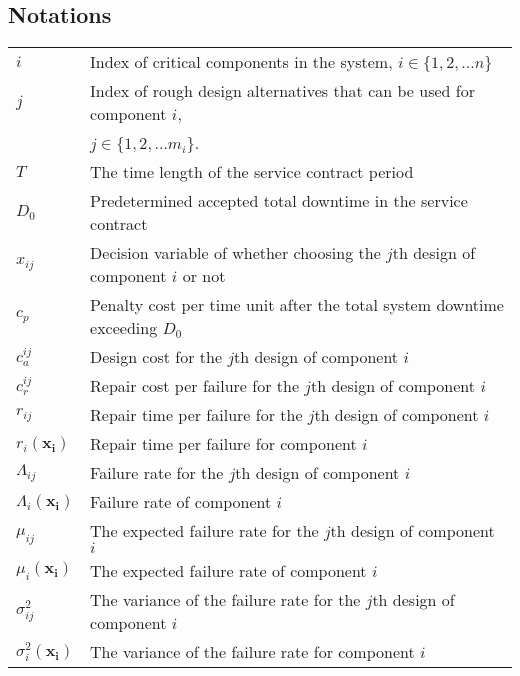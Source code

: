 \documentclass[preprint,12pt]{elsarticle}
\begin{document}
 \subsection{Notations}
   \begin{tabular}{l l}
$i$ & Index of critical components in the system, $i \in \{1,2,...n\}$\\
$j$ & Index of rough design alternatives that can be used for component $i$, \\
    & $j \in \{1,2,...m_{i}\}$.\\
$T$ & The time length of the service contract period\\
$D_0$ & Predetermined accepted total downtime in the service contract\\
$x_{ij}$ & Decision variable of whether choosing the $j$th design of component $i$ or not\\
$c_p$ & Penalty cost per time unit after the total system downtime exceeding $D_0$\\
$c^{ij}_{a}$ & Design cost for the $j$th design of component $i$\\
$c_r^{ij}$ & Repair cost per failure for the $j$th design of component $i$\\
$r_{ij}$ & Repair time per failure for the $j$th design of component $i$\\
$r_{i}(\boldsymbol{x_{i}})$ & Repair time per failure for component $i$\\
$\Lambda_{ij}$ & Failure rate for the $j$th design of component $i$\\
$\Lambda_{i}(\boldsymbol{x_{i}})$  & Failure rate of component $i$\\
$\mu_{ij}$ & The expected failure rate for the $j$th design of component $i$ \\
$\mu_{i}(\boldsymbol{x_{i}})$ & The expected failure rate of component $i$ \\
$\sigma_{ij}^{2}$ & The variance of the failure rate for the $j$th design of component $i$\\
$\sigma_{i}^{2}(\boldsymbol{x_{i}})$ &  The variance of the failure rate for component $i$ \\

\end{tabular}
\end{document}
